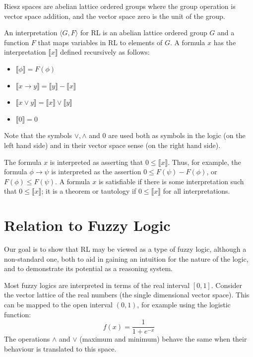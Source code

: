 \documentclass[preprint,leqno]{elsarticle}
\newcommand{\interp}[1]{\llbracket #1 \rrbracket}
\begin{document}
Riesz spaces are abelian lattice ordered groups where the group
operation is vector space addition, and the vector space zero is the
unit of the group.

An interpretation $\langle G, F\rangle$ for RL is an abelian lattice
ordered group $G$ and a function $F$ that maps variables in RL to
elements of $G$. A formula $x$ has the interpretation $\interp{x}$
defined recursively as follows:
\begin{itemize}
\item $\interp{\phi} = F(\phi)$
\item $\interp{x \rightarrow y} = \interp{y} - \interp{x}$
\item $\interp{x \lor y} = \interp{x} \lor \interp{y}$
\item $\interp{0} = 0$
\end{itemize}
Note that the symbols $\lor, \land$ and $0$ are used both as symbols
in the logic (on the left hand side) and in their vector space sense
(on the right hand side).

The formula $x$ is interpreted as asserting that $0 \le
\interp{x}$. Thus, for example, the formula $\phi \rightarrow \psi$ is
interpreted as the assertion $0 \le F(\psi) - F(\phi)$, or $F(\phi)
\le F(\psi)$. A formula $x$ is satisfiable if there is some
interpretation such that $0 \le \interp{x}$; it is a theorem or
tautology if $0 \le \interp{x}$ for all interpretations.

\section{Relation to Fuzzy Logic}

Our goal is to show that RL may be viewed as a type of fuzzy logic,
although a non-standard one, both to aid in gaining an intuition for
the nature of the logic, and to demonstrate its potential as a
reasoning system.

Most fuzzy logics are interpreted in terms of the real interval
$[0,1]$. Consider the vector lattice of the real numbers (the
single dimensional vector space). This can be mapped to the open
interval $(0,1)$, for example using the logistic function:
$$f(x) = \frac{1}{1 + e^{-x}}$$
The operations $\land$ and $\lor$ (maximum and minimum) behave the
same when their behaviour is translated to this space.
\end{document}
